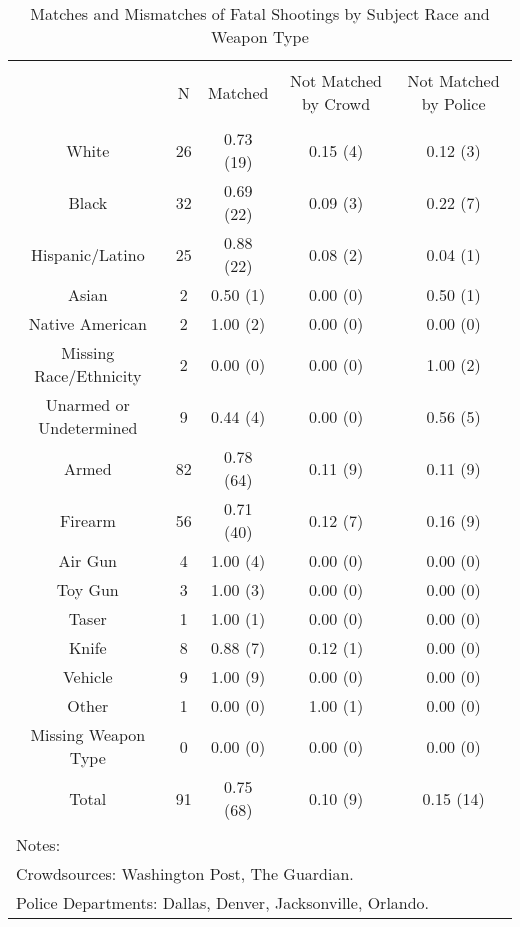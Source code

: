 
\begin{table}[!htbp] \centering 
  \caption{Matches and Mismatches of Fatal Shootings by Subject Race and Weapon Type} 
  \label{} 
\footnotesize 
\begin{tabular}{@{\extracolsep{5pt}} ccccc} 
\\[-1.8ex]\hline 
\hline \\[-1.8ex] 
 & N & Matched & Not Matched by Crowd & Not Matched by Police \\ 
\hline \\[-1.8ex] 
White & 26 & 0.73 (19) & 0.15 (4) & 0.12 (3) \\ 
Black & 32 & 0.69 (22) & 0.09 (3) & 0.22 (7) \\ 
Hispanic/Latino & 25 & 0.88 (22) & 0.08 (2) & 0.04 (1) \\ 
Asian & 2 & 0.50 (1) & 0.00 (0) & 0.50 (1) \\ 
Native American & 2 & 1.00 (2) & 0.00 (0) & 0.00 (0) \\ 
Missing Race/Ethnicity & 2 & 0.00 (0) & 0.00 (0) & 1.00 (2) \\ 
Unarmed or Undetermined & 9 & 0.44 (4) & 0.00 (0) & 0.56 (5) \\ 
Armed & 82 & 0.78 (64) & 0.11 (9) & 0.11 (9) \\ 
Firearm & 56 & 0.71 (40) & 0.12 (7) & 0.16 (9) \\ 
Air Gun & 4 & 1.00 (4) & 0.00 (0) & 0.00 (0) \\ 
Toy Gun & 3 & 1.00 (3) & 0.00 (0) & 0.00 (0) \\ 
Taser & 1 & 1.00 (1) & 0.00 (0) & 0.00 (0) \\ 
Knife & 8 & 0.88 (7) & 0.12 (1) & 0.00 (0) \\ 
Vehicle & 9 & 1.00 (9) & 0.00 (0) & 0.00 (0) \\ 
Other & 1 & 0.00 (0) & 1.00 (1) & 0.00 (0) \\ 
Missing Weapon Type & 0 & 0.00 (0) & 0.00 (0) & 0.00 (0) \\ 
Total & 91 & 0.75 (68) & 0.10 (9) & 0.15 (14) \\ 
\hline \\[-1.8ex] 
\multicolumn{5}{l}{Notes:} \\ 
\multicolumn{5}{l}{Crowdsources: Washington Post, The Guardian.} \\ 
\multicolumn{5}{l}{Police Departments: Dallas, Denver, Jacksonville, Orlando.} \\ 
\end{tabular} 
\end{table}  
